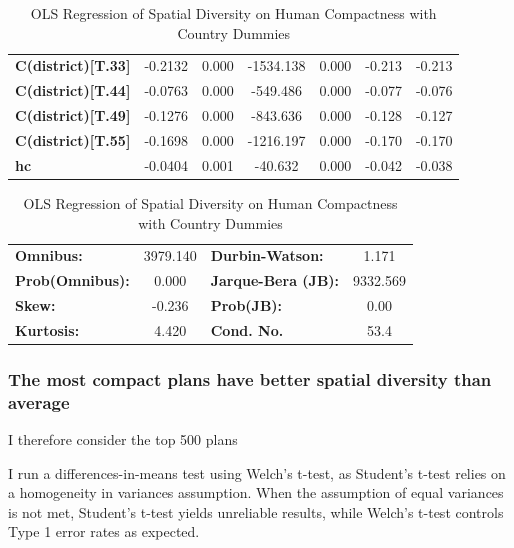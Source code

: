 \documentclass[]{article}
\begin{document}
\begin{table}[h!]
\begin{center}
\begin{tabular}{lcccccc}
\textbf{C(district)[T.33]} &      -0.2132  &        0.000     & -1534.138  &         0.000        &       -0.213    &       -0.213     \\
\textbf{C(district)[T.44]} &      -0.0763  &        0.000     &  -549.486  &         0.000        &       -0.077    &       -0.076     \\
\textbf{C(district)[T.49]} &      -0.1276  &        0.000     &  -843.636  &         0.000        &       -0.128    &       -0.127     \\
\textbf{C(district)[T.55]} &      -0.1698  &        0.000     & -1216.197  &         0.000        &       -0.170    &       -0.170     \\
\textbf{hc}                &      -0.0404  &        0.001     &   -40.632  &         0.000        &       -0.042    &       -0.038     \\
\bottomrule
\end{tabular}
\begin{tabular}{lclc}
\textbf{Omnibus:}       & 3979.140 & \textbf{  Durbin-Watson:     } &    1.171  \\
\textbf{Prob(Omnibus):} &   0.000  & \textbf{  Jarque-Bera (JB):  } & 9332.569  \\
\textbf{Skew:}          &  -0.236  & \textbf{  Prob(JB):          } &     0.00  \\
\textbf{Kurtosis:}      &   4.420  & \textbf{  Cond. No.          } &     53.4  \\
\bottomrule
\end{tabular}
\caption{OLS Regression of Spatial Diversity on Human Compactness with
Country Dummies}
\label{table:ols_sd_hc}
\end{center}
\end{table}

\hypertarget{the-most-compact-plans-have-better-spatial-diversity-than-average}{%
\subsubsection{The most compact plans have better spatial diversity than
average}\label{the-most-compact-plans-have-better-spatial-diversity-than-average}}

I therefore consider the top 500 plans

I run a differences-in-means test using Welch's t-test, as Student's
t-test relies on a homogeneity in variances assumption. When the
assumption of equal variances is not met, Student's t-test yields
unreliable results, while Welch's t-test controls Type 1 error rates as
expected. \cite{delacre2017}
\end{document}
